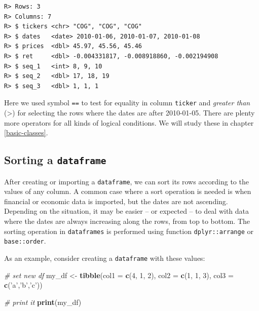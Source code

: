 \documentclass[
  12pt,
]{book}
\newenvironment{Shaded}{\begin{snugshade}}{\end{snugshade}}
\newcommand{\CommentTok}[1]{\textcolor[rgb]{0.37,0.37,0.37}{\textit{#1}}}
\newcommand{\DataTypeTok}[1]{\textcolor[rgb]{0.27,0.27,0.27}{#1}}
\newcommand{\DecValTok}[1]{\textcolor[rgb]{0.06,0.06,0.06}{#1}}
\newcommand{\KeywordTok}[1]{\textcolor[rgb]{0.27,0.27,0.27}{\textbf{#1}}}
\newcommand{\NormalTok}[1]{#1}
\newcommand{\StringTok}[1]{\textcolor[rgb]{0.5,0.5,0.5}{#1}}
\begin{document}
\begin{verbatim}
R> Rows: 3
R> Columns: 7
R> $ tickers <chr> "COG", "COG", "COG"
R> $ dates   <date> 2010-01-06, 2010-01-07, 2010-01-08
R> $ prices  <dbl> 45.97, 45.56, 45.46
R> $ ret     <dbl> -0.004331817, -0.008918860, -0.002194908
R> $ seq_1   <int> 8, 9, 10
R> $ seq_2   <dbl> 17, 18, 19
R> $ seq_3   <dbl> 1, 1, 1
\end{verbatim}

Here we used symbol \texttt{==} to test for equality in column \texttt{ticker} and \emph{greater than} (\textgreater) for selecting the rows where the dates are after 2010-01-05. There are plenty more operators for all kinds of logical conditions. We will study these in chapter \ref{basic-classes}.

\hypertarget{sorting-a-dataframe}{%
\subsection{\texorpdfstring{Sorting a \texttt{dataframe}}{Sorting a dataframe}}\label{sorting-a-dataframe}}

After creating or importing a \texttt{dataframe}, we can sort its rows according to the values of any column. A common case where a sort operation is needed is when financial or economic data is imported, but the dates are not ascending. Depending on the situation, it may be easier -- or expected -- to deal with data where the dates are always increasing along the rows, from top to bottom. The sorting operation in \texttt{dataframes} is performed using function \texttt{dplyr::arrange} or \texttt{base::order}.  

As an example, consider creating a \texttt{dataframe} with these values:

\begin{Shaded}
\begin{Highlighting}[]
\CommentTok{# set new df}
\NormalTok{my_df <-}\StringTok{ }\KeywordTok{tibble}\NormalTok{(}\DataTypeTok{col1 =} \KeywordTok{c}\NormalTok{(}\DecValTok{4}\NormalTok{, }\DecValTok{1}\NormalTok{, }\DecValTok{2}\NormalTok{), }
                \DataTypeTok{col2 =} \KeywordTok{c}\NormalTok{(}\DecValTok{1}\NormalTok{, }\DecValTok{1}\NormalTok{, }\DecValTok{3}\NormalTok{), }
                \DataTypeTok{col3 =} \KeywordTok{c}\NormalTok{(}\StringTok{'a'}\NormalTok{,}\StringTok{'b'}\NormalTok{,}\StringTok{'c'}\NormalTok{))}

\CommentTok{# print it                  }
\KeywordTok{print}\NormalTok{(my_df)}
\end{Highlighting}
\end{Shaded}
\end{document}
